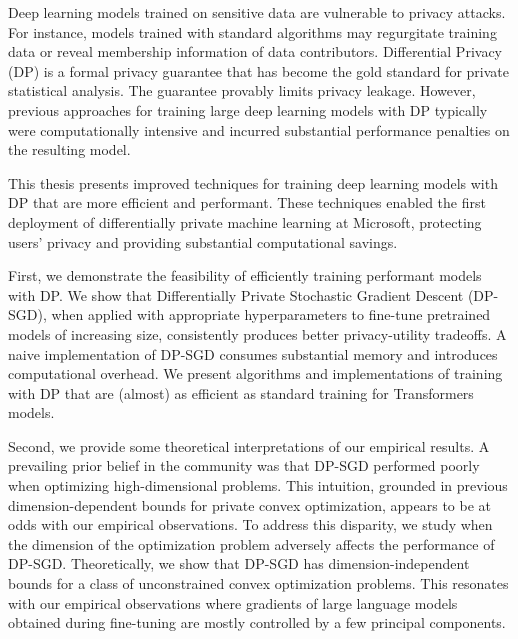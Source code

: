 
Deep learning models trained on sensitive data are vulnerable to privacy attacks.
For instance, models trained with standard algorithms may regurgitate training data or reveal membership information of data contributors.
Differential Privacy (DP) is a formal privacy guarantee that has become the gold standard for private statistical analysis.
The guarantee provably limits privacy leakage.
However, previous approaches for training large deep learning models with DP typically were computationally intensive and incurred substantial performance penalties on the resulting model.

This thesis presents improved techniques for training deep learning models with DP that are more efficient and performant.
These techniques enabled the first deployment of differentially private machine learning at Microsoft, protecting users' privacy and providing substantial computational savings.

First, we demonstrate the feasibility of efficiently training performant models with DP. 
We show that Differentially Private Stochastic Gradient Descent (DP-SGD), when applied with appropriate hyperparameters to fine-tune pretrained models of increasing size, consistently produces better privacy-utility tradeoffs. A naive implementation of DP-SGD consumes substantial memory and introduces computational overhead. We present algorithms and implementations of training with DP that are (almost) as efficient as standard training for Transformers models.

Second, we provide some theoretical interpretations of our empirical results.
A prevailing prior belief in the community was that DP-SGD performed poorly when optimizing high-dimensional problems. This intuition, grounded in previous dimension-dependent bounds for private convex optimization, appears to be at odds with our empirical observations. To address this disparity, we study when the dimension of the optimization problem adversely affects the performance of DP-SGD. Theoretically, we show that DP-SGD has dimension-independent bounds for a class of unconstrained convex optimization problems. 
This resonates with our empirical observations where gradients of large language models obtained during fine-tuning are mostly controlled by a few principal components.
